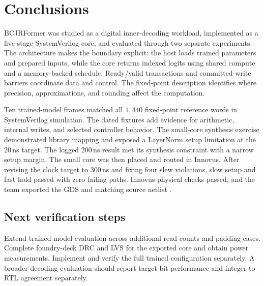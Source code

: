 \section{Conclusions}
BCJRFormer was studied as a digital inner-decoding workload, implemented as a five-stage SystemVerilog core, and evaluated through two separate experiments. The architecture makes the boundary explicit: the host loads trained parameters and prepared inputs, while the core returns indexed logits using shared compute and a memory-backed schedule. Ready/valid transactions and committed-write barriers coordinate data and control. The fixed-point description identifies where precision, approximations, and rounding affect the computation.

Ten trained-model frames matched all \(1{,}440\) fixed-point reference words in SystemVerilog simulation. The dated fixtures add evidence for arithmetic, internal writes, and selected controller behavior. The small-core synthesis exercise demonstrated library mapping and exposed a LayerNorm setup limitation at the 20\,ns target. The logged 200\,ns result met its synthesis constraint with a narrow setup margin. The small core was then placed and routed in Innovus. After revising the clock target to 300\,ns and fixing four slew violations, slow setup and fast hold passed with zero failing paths. Innovus physical checks passed, and the team exported the GDS and matching source netlist \cite{backend}.

\subsection*{Next verification steps}
Extend trained-model evaluation across additional read counts and padding cases. Complete foundry-deck DRC and LVS for the exported core and obtain power measurements. Implement and verify the full trained configuration separately. A broader decoding evaluation should report target-bit performance and integer-to-RTL agreement separately.

